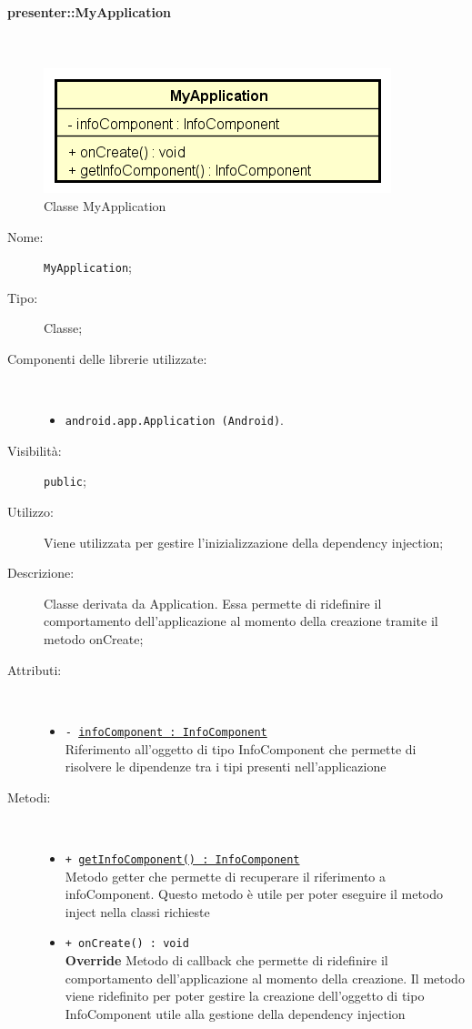 \documentclass[../DefinizioneDiProdotto.tex]{subfiles}
\begin{document}
\paragraph{presenter::MyApplication}
\
\begin{figure}[H]
	\centering
	\includegraphics[width=\maxwidth]{img/MyApplication.png}
	\caption{Classe MyApplication}\label{fig:presenter::MyApplication} 
\end{figure}
\begin{description}
	\item[Nome:] \texttt{MyApplication};
	\item[Tipo:] Classe;
	\item[Componenti delle librerie utilizzate:] \
	\begin{itemize}
		\item \texttt{android.app.Application (Android)}.
		
	\end{itemize}
	\item[Visibilità:] \texttt{public};
	\item[Utilizzo:] Viene utilizzata per gestire l'inizializzazione della dependency injection;
	\item[Descrizione:] Classe derivata da Application. Essa permette di ridefinire il comportamento dell'applicazione al momento della creazione tramite il metodo onCreate;
	\item[Attributi:] \
	\begin{itemize}
		\item \texttt{- \underline{infoComponent : InfoComponent}}\\
		Riferimento all'oggetto di tipo InfoComponent che permette di risolvere le dipendenze tra i tipi presenti nell'applicazione
		
	\end{itemize}
	\item[Metodi:] \
	\begin{itemize}
		\item \texttt{+ \underline{getInfoComponent() : InfoComponent}}\\
		Metodo getter che permette di recuperare il riferimento a infoComponent. Questo metodo è utile per poter eseguire il metodo inject nella classi richieste
		\item \texttt{+ onCreate() : void}\\
		\textbf{Override} Metodo di callback che permette di ridefinire il comportamento dell'applicazione al momento della creazione. Il metodo viene ridefinito per poter gestire la creazione dell'oggetto di tipo InfoComponent utile alla gestione della dependency injection
	\end{itemize}
\end{description}
\end{document}
